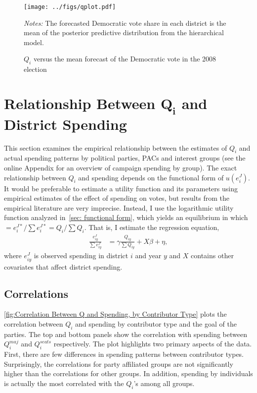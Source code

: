 \documentclass[12pt,final,fleqn]{article}
\theoremstyle{plain}
\begin{document}
\begin{figure}[!htb]
\texttt{[image: ../figs/qplot.pdf]}
\vspace{.5cm}
\caption{$Q_i$ versus the mean forecast of the Democratic vote in the 2008 election}
\label{fig: $Q_i$ versus the mean forecast of the Democratic vote in the 2008 election}
\begin{minipage}{\linewidth}
\footnotesize
\emph{Notes:} The forecasted Democratic vote share in each district is the mean of the posterior predictive distribution from the hierarchical model.
\end{minipage}
\end{figure}

\section{Relationship Between $\mathbf{Q_i}$ and District Spending}
This section examines the empirical relationship between the estimates of $Q_i$ and actual spending patterns by political parties, PACs and interest groups (see the online Appendix for an overview of campaign spending by group). The exact relationship between $Q_i$ and spending depends on the functional form of $u(e^J_i)$. It would be preferable to estimate a utility function and its parameters using empirical estimates of the effect of spending on votes, but results from the empirical literature are very imprecise. Instead, I use the logarithmic utility function analyzed in~\autoref{sec: functional form}, which yields an equilibrium in which $=e_i^{J*}/\sum e_i^{J*} =Q_i/\sum Q_i$. That is, I estimate the regression equation,
\begin{align} \label{eqn: regression eqn}
\frac{e_{iy}^{J}}{\sum e_{iy}^{J}} &= \gamma \frac{Q_{iy}}{\sum Q_{iy}} + X\beta + \eta,
\end{align} 
where $e_{iy}^{J}$ is observed spending in district $i$ and year $y$ and $X$ contains other covariates that affect district spending.
 
\subsection{Correlations}
\autoref{fig:Correlation Between Q and Spending, by Contributor Type} plots the correlation between $Q_i$ and spending by contributor type and the goal of the parties. The top and bottom panels show the correlation with spending between $Q_i^{maj}$ and $Q_i^{seats}$ respectively. The plot highlights two primary aspects of the data. First, there are few differences in spending patterns between contributor types. Surprisingly, the correlations for party affiliated groups are not significantly higher than the correlations for other groups. In addition, spending by individuals is actually the most correlated with the $Q_i$'s among all groups. 
\end{document}
